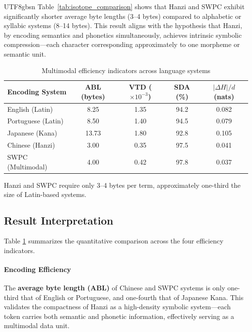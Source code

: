\documentclass[conference]{IEEEtran}
\begin{document}
\begin{CJK*}{UTF8}{gbsn}
Table~\ref{tab:isotope_comparison} shows that Hanzi and SWPC exhibit significantly shorter average byte lengths (3–4 bytes) compared to alphabetic or syllabic systems (8–14 bytes).  
This result aligns with the hypothesis that Hanzi, by encoding semantics and phonetics simultaneously, achieves intrinsic symbolic compression—each character corresponding approximately to one morpheme or semantic unit.

\begin{table}[htbp]
\centering
\caption{Multimodal efficiency indicators across language systems}
\label{tab:efficiency_metrics}
\footnotesize
\renewcommand{\arraystretch}{1.2}
\begin{tabular}{|l|c|c|c|c|}
\hline
\toprule
\textbf{Encoding System} & \textbf{ABL (bytes)} & \textbf{VTD ($\times10^{-3}$)} & \textbf{SDA (\%)} & \textbf{$|\Delta H|/d$ (nats)} \\
\midrule
\hline
English (Latin) & 8.25 & 1.35 & 94.2 & 0.082 \\
\hline
Portuguese (Latin) & 8.50 & 1.40 & 94.5 & 0.079 \\
\hline
Japanese (Kana) & 13.73 & 1.80 & 92.8 & 0.105 \\
\hline
Chinese (Hanzi) & 3.00 & 0.35 & 97.5 & 0.041 \\
\hline
SWPC (Multimodal) & 4.00 & 0.42 & 97.8 & 0.037 \\
\hline
\bottomrule
\end{tabular}
\end{table}

Hanzi and SWPC require only 3–4 bytes per term, approximately one-third the size of Latin-based systems.

\subsection{Result Interpretation}

Table \ref{tab:efficiency_metrics} summarizes the quantitative comparison across the four efficiency indicators.

\paragraph{Encoding Efficiency}  
The \textbf{average byte length (ABL)} of Chinese and SWPC systems is only one-third that of English or Portuguese, and one-fourth that of Japanese Kana.  
This validates the compactness of Hanzi as a high-density symbolic system—each token carries both semantic and phonetic information, effectively serving as a multimodal data unit.


\end{CJK*}
\end{document}
